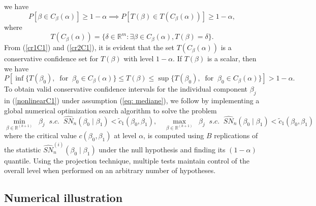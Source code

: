 \documentclass[harvard,11pt]{article}
\begin{document}
we have
\begin{equation}
P[\beta \in C_{\beta }(\alpha )]\geq 1-\alpha \implies P%
[T(\beta )\in T(C_{\beta }(\alpha ))]\geq 1-\alpha,   \label{cr2C1}
\end{equation}%
where
\begin{equation*}
T(C_{\beta }(\alpha ))=\{\delta \in \mathbb{R}^{m}:\exists \beta \in
C_{\beta }(\alpha ),T(\beta )=\delta \}.
\end{equation*}%
From (\ref{cr1C1}) and (\ref{cr2C1}), it is evident that the set $T(C_{\beta }(\alpha ))$ is a
conservative confidence set for $T(\beta )$ with level $1-\alpha $. If $%
T(\beta )$ is a scalar, then we have
\begin{equation*}
P[\inf \{T(\beta _{0}),\;\;\text{for}\;\;\beta _{0}\in C_{\beta
}(\alpha )\}\leq T(\beta )\leq \sup \{T(\beta _{0}),\;\;\text{for}\;\;\beta
_{0}\in C_{\beta }(\alpha )\}]>1-\alpha .
\end{equation*}
To obtain valid conservative confidence intervals for the individual component $\beta_j$ in (\ref{nonlinearC1}) under assumption (\ref{eq: mediane}), we follow \citet{coudin2009finite} by implementing a global numerical optimization search algorithm to solve the problem
\begin{equation}\label{eq: SA} 
\min\limits_{\beta\in\mathbb{R}^{(k+1)}}\;\;\beta_j\;\;s.c.\;\;\widehat{SN}_{n}(\beta_0\mid\beta_1)<\tilde{c}_1(\beta _{0},\beta _{1}),\quad\max\limits_{\beta\in\mathbb{R}^{(k+1)}}\;\;\beta_j\;\;s.c.\;\;\widehat{SN}_{n}(\beta_0\mid\beta_1)<\tilde{c}_1(\beta _{0},\beta _{1}) 
\end{equation}
where the critical value $c(\beta_0,\beta_1)$ at level $\alpha$, is computed using $B$ replications of the statistic $\widehat{SN}_{n}^{(i)}(\beta_0\mid\beta_1)$ under the null hypothesis and finding its $(1-\alpha)$ quantile. Using the projection technique, multiple tests maintain control of the overall level when performed on an arbitrary number of hypotheses. 

\subsection{Numerical illustration}\label{Numerical illustration}
\end{document}
